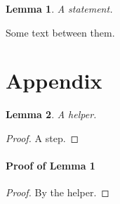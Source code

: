 \documentclass{article}
\newtheorem{lemma}{Lemma}
\begin{document}
\begin{lemma}
A statement.
\end{lemma}
Some text between them.

\section{Appendix}
\begin{lemma}
A helper.
\end{lemma}
\begin{proof}
A step.
\end{proof}

\paragraph{Proof of Lemma 1}
\begin{proof}
By the helper.
\end{proof}
\end{document}
